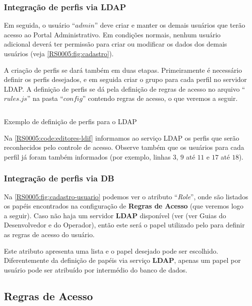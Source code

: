 \subsubsection{Integração de perfis via LDAP}

Em seguida, o usuário ``$admin$'' deve criar e manter os demais usuários que terão acesso ao Portal Administrativo. Em condições normais, nenhum usuário adicional deverá ter permissão para criar ou modificar os dados dos demais usuários (veja \cref{RS0005:fig:cadastro}).

A criação de perfis se dará também em duas etapas. Primeiramente é necessário definir os perfis desejados, e em seguida criar o grupo para cada perfil no servidor \gls{LDAP}. A definição de perfis se dá pela definição de regras de acesso no arquivo ``$rules.js$'' na pasta ``$config$'' contendo regras de acesso, o que veremos a seguir.

\begin{code}
    \inputminted[xleftmargin=20pt,fontsize=\footnotesize,breaklines,breakanywhere,linenos=true,label=editors.ldif]{YAML}{../RS0005/anexos/editors.ldif}
    \caption{Exemplo de definição de perfis para o LDAP}\label{RS0005:code:editores-ldif}
\end{code}

Na \cref{RS0005:code:editores-ldif} informamos ao serviço \gls{LDAP} os perfis que serão reconhecidos pelo controle de acesso. Observe também que os usuários para cada perfil já foram também informados (por exemplo, linhas $3$, $9$ até $11$ e $17$ até $18$).

\subsubsection{Integração de perfis via DB}

Na \cref{RS0005:fig:cadastro-usuario} podemos ver o atributo ``\textit{Role}'', onde são listados os papéis encontrados na configuração de \textbf{Regras de Acesso} (que veremos logo a seguir). Caso não haja um servidor \textbf{LDAP} disponível (ver (ver Guias do Desenvolvedor e do Operador), então este será o papel utilizado pelo para definir as regras de acesso do usuário.

Este atributo apresenta uma lista e o papel desejado pode ser escolhido. Diferentemente da definição de papéis via serviço \textbf{LDAP}, apenas um papel por usuário pode ser atribuído por intermédio do banco de dados.

\subsection{Regras de Acesso}

